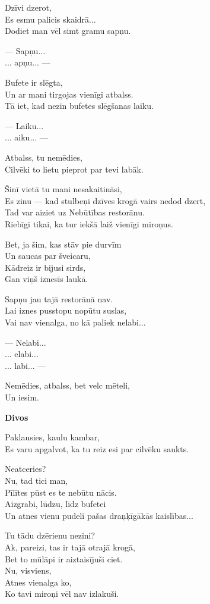 \documentclass[14pt]{extarticle}
\begin{document}
Dzīvi dzerot,\\
Es esmu palicis skaidrā...\\
Dodiet man vēl simt gramu sapņu.

--- Sapņu...\\
... apņu... ---

Bufete ir slēgta,\\
Un ar mani tirgojas vienīgi atbalss.\\
Tā iet, kad nezin bufetes slēgšanas laiku.

--- Laiku...\\
... aiku... ---

Atbalss, tu nemēdies,\\
Cilvēki to lietu pieprot par tevi labāk.

Šinī vietā tu mani nesakaitināsi,\\
Es zinu --- kad stulbeņi dzīves krogā vairs nedod dzert,\\
Tad var aiziet uz Nebūtības restorānu.\\
Riebīgi tikai, ka tur iekšā laiž vienīgi miroņus.

Bet, ja šim, kas stāv pie durvīm\\
Un saucas par šveicaru,\\
Kādreiz ir bijusi sirds,\\
Gan viņš iznesīs laukā.

Sapņu jau tajā restorānā nav.\\
Lai iznes pusstopu nopūtu suslas,\\
Vai nav vienalga, no kā paliek nelabi...

--- Nelabi...\\
... elabi...\\
... labi... ---

Nemēdies, atbalss, bet velc mēteli,\\
Un iesim.

\newpage

{\bf Divos}

Paklausies, kaulu kambar,\\
Es varu apgalvot, ka tu reiz esi par cilvēku saukts.

Neatceries?\\
Nu, tad tici man,\\
Pīlītes pūst es te nebūtu nācis.\\
Aizgrabi, lūdzu, līdz bufetei\\
Un atnes vienu pudeli pašas draņķīgākās kaislības...

Tu tādu dzērienu nezini?\\
Ak, pareizi, tas ir tajā otrajā krogā,\\
Bet to mūlāpi ir aiztaisījuši ciet.\\
Nu, visviens,\\
Atnes vienalga ko,\\
Ko tavi miroņi vēl nav izlakuši.
\end{document}
